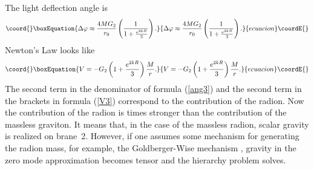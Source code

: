 \documentclass[a4paper,12pt]{article}
\begin{document}
The light deflection angle  is
\begin{equation}\coord{}\boxEquation{\label{ang3}
\Delta\varphi\approx\frac{4MG_{2}}{r_{0}}\left(\frac{1}{1+\frac{e^{2kR}}{3}}\right).
}{\Delta\varphi\approx\frac{4MG_{2}}{r_{0}}\left(\frac{1}{1+\frac{e^{2kR}}{3}}\right).
}{ecuacion}\coordE{}\end{equation}
Newton's Law looks like
\begin{equation}\coord{}\boxEquation{\label{V3}
V=-G_{2}\left(1+\frac{e^{2kR}}{3}\right)\frac{M}{r}.
}{V=-G_{2}\left(1+\frac{e^{2kR}}{3}\right)\frac{M}{r}.
}{ecuacion}\coordE{}\end{equation}
The second term in the denominator of formula (\ref{ang3}) and the
second term in the brackets in formula (\ref{V3}) correspond to the contribution
of the radion. Now the  contribution of the radion is \coordHE{}
times stronger than the contribution of the massless graviton. It
means that, in the case of the massless radion, scalar gravity is
realized on brane~2. However, if one assumes some mechanism for
generating the radion mass, for example, the Goldberger-Wise
mechanism \cite{wise}, gravity in the zero mode approximation
becomes tensor and the hierarchy problem solves.
\end{document}
